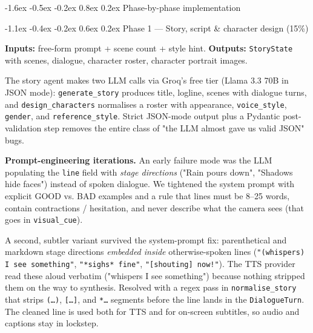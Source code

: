\documentclass[11pt,a4paper]{article}
\makeatletter
\renewcommand\section{\@startsection{section}{1}{\z@}%
   {-1.6ex \@plus -0.5ex \@minus -0.2ex}%
   {0.8ex \@plus 0.2ex}%
   {\Large\bfseries\color{accent}}}
\renewcommand\subsection{\@startsection{subsection}{2}{\z@}%
   {-1.1ex \@plus -0.4ex \@minus -0.2ex}%
   {0.6ex \@plus 0.2ex}%
   {\large\bfseries\color{accent!85!black}}}
\newcommand{\code}[1]{\texttt{\small #1}}
\makeatother
\begin{document}
\bigskip
\section{Phase-by-phase implementation}

\subsection{Phase 1 --- Story, script \& character design (15\%)}

\textbf{Inputs:} free-form prompt + scene count + style hint.
\textbf{Outputs:} \code{StoryState} with scenes, dialogue, character roster,
character portrait images.

The story agent makes two LLM calls via Groq's free tier (Llama 3.3 70B in JSON
mode): \code{generate\_story} produces title, logline, scenes with dialogue
turns, and \code{design\_characters} normalises a roster with appearance,
\code{voice\_style}, \code{gender}, and \code{reference\_style}. Strict JSON-mode
output plus a Pydantic post-validation step removes the entire class of
"the LLM almost gave us valid JSON" bugs.

\textbf{Prompt-engineering iterations.} An early failure mode was the LLM
populating the \code{line} field with \emph{stage directions} ("Rain pours
down", "Shadows hide faces") instead of spoken dialogue. We tightened the
system prompt with explicit GOOD vs. BAD examples and a rule that lines must be
8--25 words, contain contractions / hesitation, and never describe what the
camera sees (that goes in \code{visual\_cue}).

A second, subtler variant survived the system-prompt fix: parenthetical and
markdown stage directions \emph{embedded inside} otherwise-spoken lines
(\texttt{"(whispers) I see something"}, \texttt{"*sighs* fine"},
\texttt{"[shouting] now!"}). The TTS provider read these aloud verbatim
("whispers I see something") because nothing stripped them on the way to
synthesis. Resolved with a regex pass in \code{normalise\_story} that strips
\texttt{(\ldots)}, \texttt{[\ldots]}, and \texttt{*\ldots*} segments before the
line lands in the \code{DialogueTurn}. The cleaned line is used both for TTS
and for on-screen subtitles, so audio and captions stay in lockstep.
\end{document}
